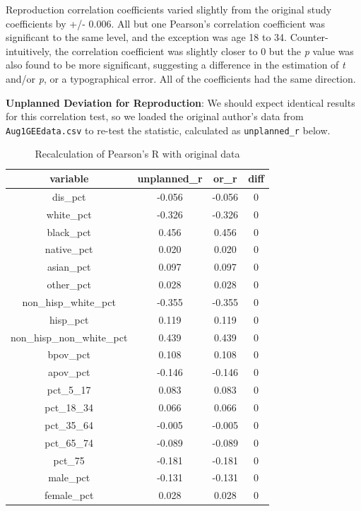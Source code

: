 \documentclass[
]{article}
\begin{document}
Reproduction correlation coefficients varied slightly from the original
study coefficients by +/- 0.006. All but one Pearson's correlation
coefficient was significant to the same level, and the exception was age
18 to 34. Counter-intuitively, the correlation coefficient was slightly
closer to 0 but the \emph{p} value was also found to be more
significant, suggesting a difference in the estimation of \emph{t}
and/or \emph{p}, or a typographical error. All of the coefficients had
the same direction.

\textbf{Unplanned Deviation for Reproduction}: We should expect
identical results for this correlation test, so we loaded the original
author's data from \texttt{Aug1GEEdata.csv} to re-test the statistic,
calculated as \texttt{unplanned\_r} below.

\begin{table}

\caption{\label{tab:original-data-pearson-correlation}Recalculation of Pearson's R with original data}
\centering
\begin{tabular}[t]{c|c|c|c}
\hline
variable & unplanned\_r & or\_r & diff\\
\hline
dis\_pct & -0.056 & -0.056 & 0\\
\hline
white\_pct & -0.326 & -0.326 & 0\\
\hline
black\_pct & 0.456 & 0.456 & 0\\
\hline
native\_pct & 0.020 & 0.020 & 0\\
\hline
asian\_pct & 0.097 & 0.097 & 0\\
\hline
other\_pct & 0.028 & 0.028 & 0\\
\hline
non\_hisp\_white\_pct & -0.355 & -0.355 & 0\\
\hline
hisp\_pct & 0.119 & 0.119 & 0\\
\hline
non\_hisp\_non\_white\_pct & 0.439 & 0.439 & 0\\
\hline
bpov\_pct & 0.108 & 0.108 & 0\\
\hline
apov\_pct & -0.146 & -0.146 & 0\\
\hline
pct\_5\_17 & 0.083 & 0.083 & 0\\
\hline
pct\_18\_34 & 0.066 & 0.066 & 0\\
\hline
pct\_35\_64 & -0.005 & -0.005 & 0\\
\hline
pct\_65\_74 & -0.089 & -0.089 & 0\\
\hline
pct\_75 & -0.181 & -0.181 & 0\\
\hline
male\_pct & -0.131 & -0.131 & 0\\
\hline
female\_pct & 0.028 & 0.028 & 0\\
\hline
\end{tabular}
\end{table}
\end{document}
